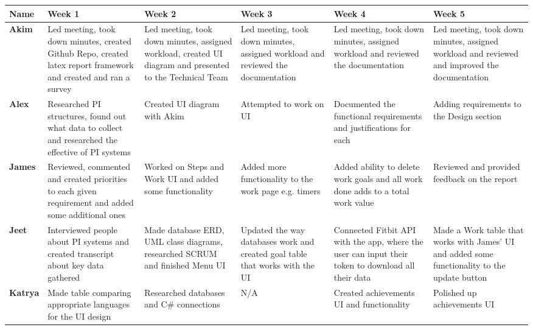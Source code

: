 \documentclass[12pt]{article}
\begin{document}
\begin{table}[!ht]
\begin{adjustwidth}{-3cm}{-3cm}
\centering
\begin{tabular}{|p{1.5cm}|p{3.1cm}|p{3cm}|p{3cm}|p{3cm}|p{3cm}|}
\hline
\textbf {Name} & \textbf{Week 1} & \textbf{Week 2} & \textbf{Week 3} & \textbf{Week 4} & \textbf{Week 5} \\
\hline
\textbf{Akim} & Led meeting, took down minutes, created Github Repo, created latex report framework and created and ran a survey& Led meeting, took down minutes, assigned workload, created UI diagram and presented to the Technical Team &  Led meeting, took down minutes, assigned workload and reviewed the documentation &  Led meeting, took down minutes, assigned workload and reviewed the documentation& Led meeting, took down minutes, assigned workload and reviewed and improved the documentation \\
\hline
\textbf{Alex} & Researched PI structures, found out what data to collect and researched the effective of PI systems & Created UI diagram with Akim & Attempted to work on UI  & Documented the functional requirements and justifications for each & Adding requirements to the Design section \\
\hline
\textbf{James} & Reviewed, commented and created priorities to each given requirement and added some additional ones & Worked on Steps and Work UI and added some functionality & Added more functionality to the work page e.g. timers & Added ability to delete work goals and all work done adds to a total work value & Reviewed and provided feedback on the report \\
\hline
\textbf{Jeet} & Interviewed people about PI systems and created transcript about key data gathered & Made database ERD, UML class diagrams, researched SCRUM and finished Menu UI & Updated the way databases work and created goal table that works with the UI & Connected Fitbit API with the app, where the user can input their token to download all their data & Made a Work table that works with James' UI and added some functionality to the update button \\
\hline
\textbf{Katrya} & Made table comparing appropriate languages for the UI design & Researched databases and C\# connections & N/A & Created achievements UI and functionality & Polished up achievements UI \\
\hline
\end{tabular}
\end{adjustwidth}
\end{table}
\end{document}
